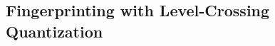  
 

\subsection{Fingerprinting with Level-Crossing Quantization}
\label{section:respiration fingerprinting}


